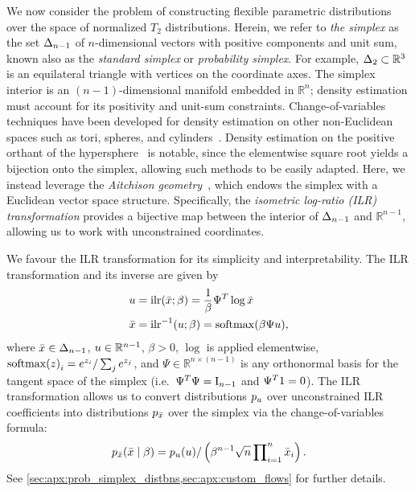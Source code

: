 We now consider the problem of constructing flexible parametric distributions over the space of normalized $T_2$ distributions.
Herein, we refer to \textit{the simplex} as the set $\Delta_{n-1}$ of $n$-dimensional vectors with positive components and unit sum, known also as the \textit{standard simplex} or \textit{probability simplex}.
For example, $\Delta_{2} \subset \mathbb{R}^3$ is an equilateral triangle with vertices on the coordinate axes.
The simplex interior is an $(n-1)$-dimensional manifold embedded in $\mathbb{R}^n$;
density estimation must account for its positivity and unit-sum constraints.
Change-of-variables techniques have been developed for density estimation on other non-Euclidean spaces such as tori, spheres, and cylinders~\citep{gemici_normalizing_2016, rezende_normalizing_2020, papamakarios_normalizing_2021, le_brigant_approximation_2019}.
Density estimation on the positive orthant of the hypersphere~\citep{guardiola_spherical-dirichlet_2020} is notable, since the elementwise square root yields a bijection onto the simplex, allowing such methods to be easily adapted.
Here, we instead leverage the \textit{Aitchison geometry}~\citep{aitchison_statistical_1982,aitchison_principles_1994}, which endows the simplex with a Euclidean vector space structure.
Specifically, the \textit{isometric log-ratio (\gls*{ILR}) transformation} provides a bijective map between the interior of $\Delta_{n-1}$ and $\mathbb{R}^{n-1}$, allowing us to work with unconstrained coordinates.

We favour the \gls*{ILR} transformation for its simplicity and interpretability.
The \gls*{ILR} transformation and its inverse are given by~\citep{egozcue_isometric_2003}
\begin{align}
    \vv{u}             & = \ILR{\vv{\bar{\distbn}}; \beta} = \frac{1}{\beta} \Psi^T \log \vv{\bar{\distbn}} \label{eqn:ilr_transform} \\
    \vv{\bar{\distbn}} & = \InvILR{\vv{u}; \beta} = \Softmax{\beta \Psi \vv{u}}, \label{eqn:inv_ilr_transform}
\end{align}
where $\bar{x} \in \Delta_{n-1}$, $u \in \mathbb{R}^{n-1}$, $\beta > 0$, $\log$ is applied elementwise, $\Softmax{\vv{z}}_{i} = e^{z_i} / \sum_{j} e^{z_j}$, and $\Psi \in \mathbb{R}^{n\times (n-1)}$ is any orthonormal basis for the tangent space of the simplex (i.e.\ $\Psi^T \Psi = \mathrm{I}_{n-1}$ and $\Psi^T \mathrm{1} = \mathrm{0}$).
The \gls*{ILR} transformation allows us to convert distributions $p_{u}$ over unconstrained \gls*{ILR} coefficients into distributions $p_{\bar{x}}$ over the simplex via the change-of-variables formula:
\begin{align}\label{eqn:ilr_change_of_vars}
    p_{\bar{x}}(\bar{x} \mid \beta) = p_{u}(u) / \left( \beta^{n-1} \sqrt{n} \prod\nolimits_{i=1}^{n} \bar{x}_{i} \right).
\end{align}
See \cref{sec:apx:prob_simplex_distbns,sec:apx:custom_flows} for further details.

